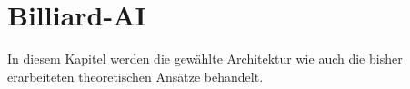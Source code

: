 \chapter{Billiard-AI}
In diesem Kapitel werden die gewählte Architektur wie auch die bisher erarbeiteten theoretischen Ansätze behandelt.
